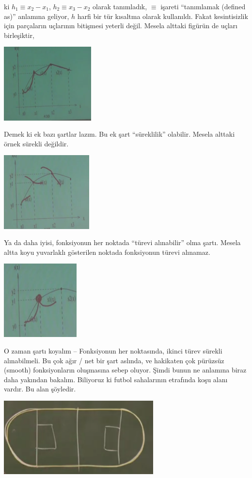 \documentclass[12pt,fleqn]{article}\usepackage{../../common}
\begin{document}
ki $h_1 \equiv x_2 - x_1$, $h_2 \equiv x_3 - x_2$ olarak tanımladık,
$\equiv$ işareti ``tanımlamak (defined as)'' anlamına geliyor, $h$
harfi bir tür kısaltma olarak kullanıldı. Fakat kesintisizlik için
parçaların uçlarının bitişmesi yeterli değil. Mesela alttaki figürün de
uçları birleşiktir,

\includegraphics[height=4cm]{spline3.png}

Demek ki ek bazı şartlar lazım. Bu ek şart ``süreklilik'' olabilir. Mesela
alttaki örnek sürekli değildir.

\includegraphics[height=4cm]{spline5.png}

Ya da daha iyisi, fonksiyonun her noktada ``türevi alınabilir'' olma
şartı. Mesela altta koyu yuvarlaklı gösterilen noktada fonksiyonun türevi
alınamaz.

\includegraphics[height=4cm]{spline4.png}

O zaman şartı koyalım -- Fonksiyonun her noktasında, ikinci türev sürekli
alınabilmeli. Bu çok ağır / net bir şart aslında, ve hakikaten çok pürüzsüz
(smooth) fonksiyonların oluşmasına sebep oluyor. Şimdi bunun ne anlamına
biraz daha yakından bakalım. Biliyoruz ki futbol sahalarının etrafında koşu
alanı vardır. Bu alan şöyledir.

\includegraphics[height=4cm]{spline6.png}
\end{document}
